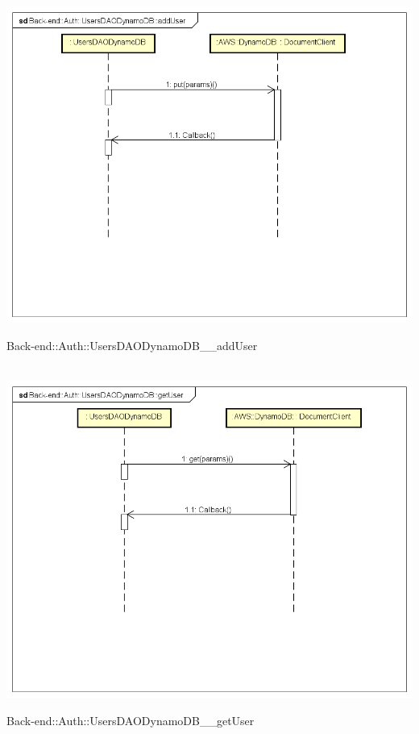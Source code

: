 \\ \includegraphics[width=\textwidth,height=\textheight,keepaspectratio]{images/diagrams/back-end/Ufficial_Backend/Back-end__Auth__UsersDAODynamoDB__addUser.png} 	\caption{Back-end::Auth::UsersDAODynamoDB__addUser}
\\ \includegraphics[width=\textwidth,height=\textheight,keepaspectratio]{images/diagrams/back-end/Ufficial_Backend/Back-end__Auth__UsersDAODynamoDB__getUser.png} 	\caption{Back-end::Auth::UsersDAODynamoDB__getUser}
